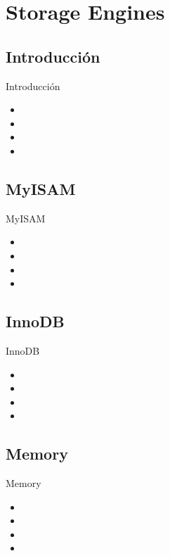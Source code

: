 \section{Storage Engines}

\subsection{Introducción}
\begin{frame}{Introducción}
  \begin{itemize}
    \item 
    \item 
    \item 
    \item 
  \end{itemize}
\end{frame}

\subsection{MyISAM}
\begin{frame}{MyISAM}
  \begin{itemize}
    \item 
    \item 
    \item 
    \item 
  \end{itemize}
\end{frame}

\subsection{InnoDB}
\begin{frame}{InnoDB}
  \begin{itemize}
    \item 
    \item 
    \item 
    \item 
  \end{itemize}
\end{frame}

\subsection{Memory}
\begin{frame}{Memory}
  \begin{itemize}
    \item 
    \item 
    \item 
    \item 
  \end{itemize}
\end{frame}

